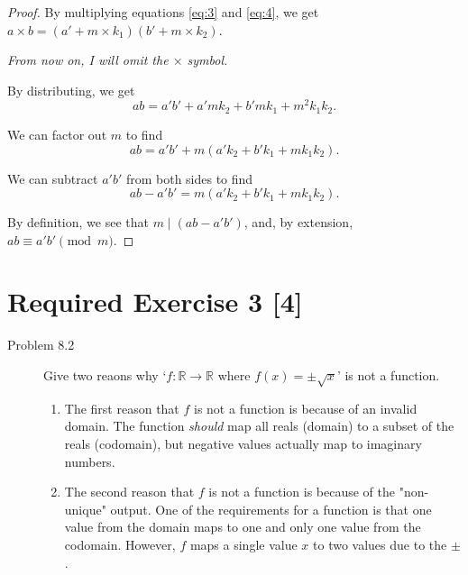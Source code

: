 \documentclass{article}
\begin{document}
\begin{enumerate}
{\begin{proof}
            By multiplying equations \ref{eq:3} and \ref{eq:4}, we get 
            \(a \times b = (a' + m\times k_1) (b' + m\times k_2)\).

            \textit{From now on, I will omit the \(\times\) symbol.}

            By distributing, we get 
            \[ab = a'b' + a'mk_2 + b'mk_1 + m^2k_1k_2.\]
            
            We can factor out \(m\) to find 
            \[ab = a'b' + m(a'k_2 + b'k_1 + mk_1k_2).\]

            We can subtract \(a'b'\) from both sides to find 
            \[ab - a'b' = m(a'k_2 + b'k_1 + mk_1k_2).\]

            By definition, we see that \(m \mid (ab - a'b')\), and, by extension, 
            \(ab \equiv a'b' \pmod{m}\).
                
        \end{proof}
    }
\end{enumerate}

\section*{Required Exercise 3 [4]}

\begin{description}
    \item[Problem 8.2] {
        Give two reaons why `\(f: \mathbb{R} \rightarrow \mathbb{R}\) where 
        \(f(x) = \pm \sqrt{x}\)' is not a function.

        \begin{enumerate}
            \item {
                The first reason that \(f\) is not a function is because of an invalid 
                domain. The function \textit{should} map all reals (domain) to a subset 
                of the reals (codomain), but negative values actually map to imaginary 
                numbers.
            }

            \item {
                The second reason that \(f\) is not a function is because of the 
                "non-unique" output. One of the requirements for a function is that 
                one value from the domain maps to one and only one value from the 
                codomain. However, \(f\) maps a single value \(x\) to two values due to 
                the \(\pm\). 
            }
        \end{enumerate}
    }
\end{description}
\end{document}
